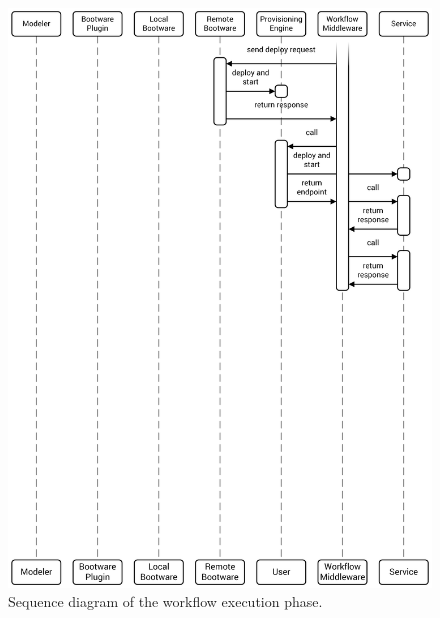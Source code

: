\begin{figure}[!htbp]
	\centering
	\includegraphics[resolution=600]{process/assets/workflow_execution_sequence}
	\caption{Sequence diagram of the workflow execution phase.}
	\label{image:execution_sequence}
\end{figure}
